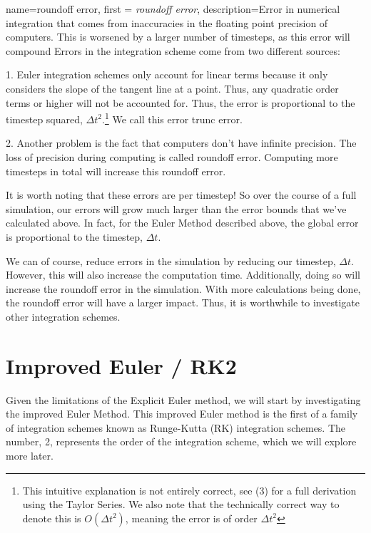 \documentclass[12pt]{report}
\begin{document}
{
    name=roundoff error,
    first = {\textit{roundoff error}},
    description={Error in numerical integration that comes from inaccuracies in the floating point precision of computers. This is worsened by a larger number of timesteps, as this error will compound}
}
Errors in the integration scheme come from two different sources:

1. Euler integration schemes only account for linear terms because it only considers the slope of the tangent line at a point. Thus, any quadratic order terms or higher will not be accounted for. Thus, the error is proportional to the timestep squared, $\Delta t^2$.\footnote{This intuitive explanation is not entirely correct, see (3) for a full derivation using the Taylor Series. We also note that the technically correct way to denote this is $O(\Delta t^2)$, meaning the error is of order $\Delta t^2$} We call this error \gls{trunc error}.

2. Another problem is the fact that computers don’t have infinite precision. The loss of precision during computing is called \gls{roundoff error}. Computing more timesteps in total will increase this \gls{roundoff error}.

It is worth noting that these errors are per timestep! So over the course of a full simulation, our errors will grow much larger than the error bounds that we’ve calculated above. In fact, for the Euler Method described above, the global error is proportional to the timestep, $\Delta t$.

We can of course, reduce errors in the simulation by reducing our timestep, $\Delta t$. However, this will also increase the computation time. Additionally, doing so will increase the \gls{roundoff error} in the simulation. With more calculations being done, the \gls{roundoff error} will have a larger impact. Thus, it is worthwhile to investigate other integration schemes.

\section{Improved Euler / RK2}
Given the limitations of the Explicit Euler method, we will start by investigating the improved Euler Method. This improved Euler method is the first of a family of integration schemes known as Runge-Kutta (RK) integration schemes. The number, 2, represents the order of the integration scheme, which we will explore more later.
\end{document}
